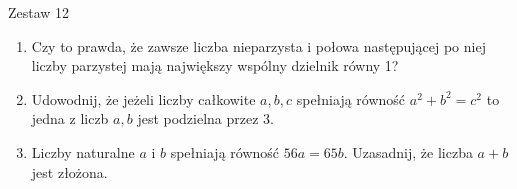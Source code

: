 \documentclass[10pt]{article}
\begin{document}
Zestaw 12

\begin{enumerate}
  \item Czy to prawda, że zawsze liczba nieparzysta i połowa następującej po niej liczby parzystej mają największy wspólny dzielnik równy 1?
  \item Udowodnij, że jeżeli liczby całkowite \(a, b, c\) spełniają równość \(a^{2}+b^{2}=c^{2}\) to jedna z liczb \(a, b\) jest podzielna przez 3.
  \item Liczby naturalne \(a\) i \(b\) spełniają równość \(56 a=65 b\). Uzasadnij, że liczba \(a+b\) jest złożona.
\end{enumerate}
\end{document}
